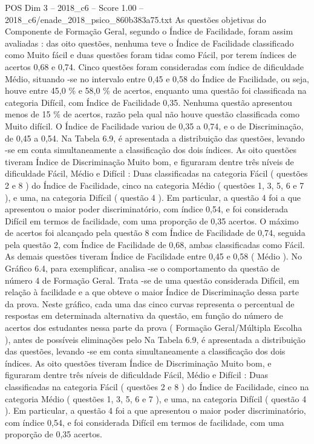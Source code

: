 \begin{textsample}{POS Dim 3 – 2018\_c6 – Score 1.00 – 2018\_c6/enade\_2018\_psico\_860b383a75.txt}
As questões objetivas do Componente de Formação Geral, segundo o Índice de Facilidade, foram assim avaliadas : das oito questões, nenhuma teve o Índice de Facilidade classificado como Muito fácil e duas questões foram tidas como Fácil, por terem índices de acertos 0,68 e 0,74.
Cinco questões foram consideradas com índice de dificuldade Médio, situando -se no intervalo entre 0,45 e 0,58 do Índice de Facilidade, ou seja, houve entre 45,0 \% e 58,0 \% de acertos, enquanto uma questão foi classificada na categoria Difícil, com Índice de Facilidade 0,35.
Nenhuma questão apresentou menos de 15 \% de acertos, razão pela qual não houve questão classificada como Muito difícil.
O Índice de Facilidade variou de 0,35 a 0,74, e o de Discriminação, de 0,45 a 0,54.
Na Tabela 6.9, é apresentada a distribuição das questões, levando -se em conta simultaneamente a classificação dos dois índices.
As oito questões tiveram Índice de Discriminação Muito bom, e figuraram dentre três níveis de dificuldade Fácil, Médio e Difícil : Duas classificadas na categoria Fácil ( questões 2 e 8 ) do Índice de Facilidade, cinco na categoria Médio ( questões 1, 3, 5, 6 e 7 ), e uma, na categoria Difícil ( questão 4 ).
Em particular, a questão 4 foi a que apresentou o maior poder discriminatório, com índice 0,54, e foi considerada Difícil em termos de facilidade, com uma proporção de 0,35 acertos.
O máximo de acertos foi alcançado pela questão 8 com Índice de Facilidade de 0,74, seguida pela questão 2, com Índice de Facilidade de 0,68, ambas classificadas como Fácil.
As demais questões tiveram Índice de Facilidade entre 0,45 e 0,58 ( Médio ).
No Gráfico 6.4, para exemplificar, analisa -se o comportamento da questão de número 4 de Formação Geral.
Trata -se de uma questão considerada Difícil, em relação à facilidade e a que obteve o maior Índice de Discriminação dessa parte da prova.
Neste gráfico, cada uma das cinco curvas representa o percentual de respostas em determinada alternativa da questão, em função do número de acertos dos estudantes nessa parte da prova ( Formação Geral/Múltipla Escolha ), antes de possíveis eliminações pelo Na Tabela 6.9, é apresentada a distribuição das questões, levando -se em conta simultaneamente a classificação dos dois índices.
As oito questões tiveram Índice de Discriminação Muito bom, e figuraram dentre três níveis de dificuldade Fácil, Médio e Difícil : Duas classificadas na categoria Fácil ( questões 2 e 8 ) do Índice de Facilidade, cinco na categoria Médio ( questões 1, 3, 5, 6 e 7 ), e uma, na categoria Difícil ( questão 4 ).
Em particular, a questão 4 foi a que apresentou o maior poder discriminatório, com índice 0,54, e foi considerada Difícil em termos de facilidade, com uma proporção de 0,35 acertos.

\end{textsample}
